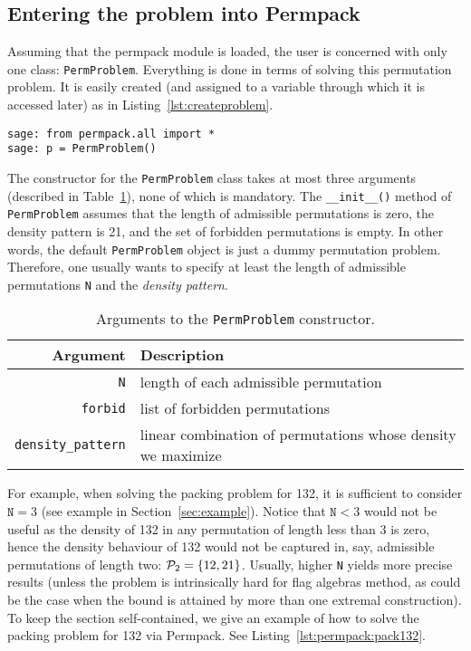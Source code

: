 \subsection{Entering the problem into Permpack}

Assuming that the permpack module is loaded, the user is concerned with only one class: \texttt{PermProblem}. Everything is done in terms of solving this permutation problem. It is easily created (and assigned to a variable through which it is accessed later) as in Listing~\ref{lst:createproblem}. 
 {}
\begin{lstlisting}
sage: from permpack.all import *
sage: p = PermProblem()
\end{lstlisting}

The constructor for the \texttt{PermProblem} class takes at most three arguments (described in Table~\ref{tab:argspermproblem}), none of which is mandatory. The \texttt{\_\_init\_\_()} method of \texttt{PermProblem} assumes that the length of admissible permutations is zero, the density pattern is 21, and the set of forbidden permutations is empty. In other words, the default \texttt{PermProblem} object is just a dummy permutation problem. Therefore, one usually wants to specify at least the length of admissible permutations \texttt{N} and the \emph{density pattern}.

\begin{table}[ht]
  \centering
    \begin{tabular}{r|l}
      \textbf{Argument} & \textbf{Description}\\
      \hline
      \texttt{N} & length of each admissible permutation\\
      \texttt{forbid} & list of forbidden permutations\\
      \texttt{density\_pattern} & linear combination of permutations whose density we maximize
    \end{tabular}
    \caption{Arguments to the \texttt{PermProblem} constructor.}
    \label{tab:argspermproblem}
\end{table}

For example, when solving the packing problem for 132, it is sufficient to consider $\texttt{N}=3$ (see example in Section~\ref{sec:example}). Notice that $\texttt{N}<3$ would not be useful as the density of 132 in any permutation of length less than 3 is zero, hence the density behaviour of 132 would not be captured in, say, admissible permutations of length two: $\P_2 = \{12,21\}$. Usually, higher \texttt{N} yields more precise results (unless the problem is intrinsically hard for flag algebras method, as could be the case when the bound is attained by more than one extremal construction). To keep the section self-contained, we give an example of how to solve the packing problem for 132 via Permpack. See Listing~\ref{lst:permpack:pack132}.

